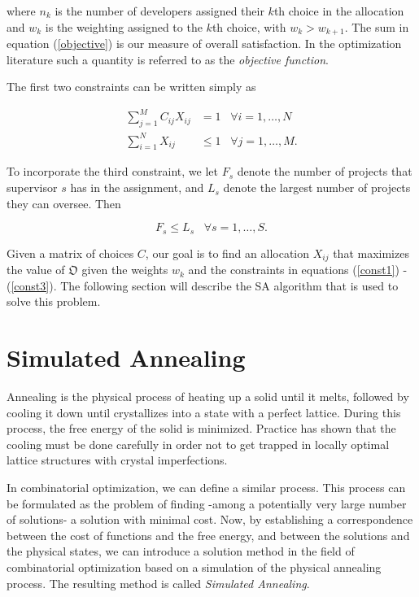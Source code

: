 \documentclass[11pt]{article}
\def\gt{>}
\begin{document}
where \(n_k\) is the number of developers assigned their \(k\)th
choice in the allocation and \(w_k\) is the weighting assigned to the
\(k\)th choice, with \(w_k \gt w_{k+1}\). The sum in equation
(\ref{objective}) is our measure of overall satisfaction. In the
optimization literature such a quantity is referred to as the
\emph{objective function}.

The first two constraints can be written simply as

\begin{align}
\sum_{j=1}^M C_{ij}X_{ij} &= 1 \;\;\; \forall i = 1, \ldots, N \label{const1}\\
\sum_{i=1}^N X_{ij} &\leq 1 \;\;\; \forall j=1, \ldots, M. \label{const2}
\end{align}


To incorporate the third constraint, we let \(F_s\) denote the number of
projects that supervisor \(s\) has in the assignment, and \(L_s\) denote
the largest number of projects they can oversee. Then

\begin{equation}
F_s \leq L_s \;\;\; \forall s = 1, \ldots, S. \label{const3}
\end{equation}

Given a matrix of choices \(C\), our goal is to find an allocation
\(X_{ij}\) that maximizes the value of \(\mathfrak O\) given the weights
\(w_k\) and the constraints in equations (\ref{const1}) - (\ref{const3}). 
The following section will describe the SA algorithm that is used to solve this problem.

    \section{Simulated Annealing}\label{simulated-annealing}

Annealing is the physical process of heating up a solid until it melts,
followed by cooling it down until crystallizes into a state with a
perfect lattice. During this process, the free energy of the solid is
minimized. Practice has shown that the cooling must be done carefully in
order not to get trapped in locally optimal lattice structures with
crystal imperfections.

In combinatorial optimization, we can define a similar process. This
process can be formulated as the problem of finding -among a potentially
very large number of solutions- a solution with minimal cost. Now, by
establishing a correspondence between the cost of functions and the free
energy, and between the solutions and the physical states, we can
introduce a solution method in the field of combinatorial optimization
based on a simulation of the physical annealing process. The resulting
method is called \emph{Simulated Annealing}.
\end{document}
